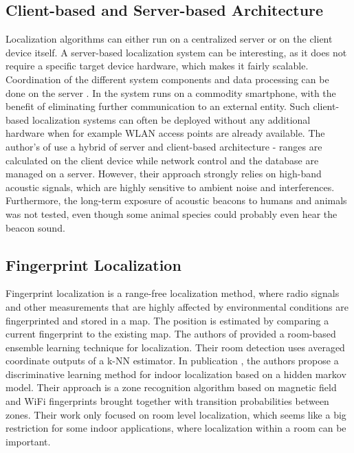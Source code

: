 \subsection{Client-based and Server-based Architecture}
Localization algorithms can either run on a centralized server or on the client device itself. A server-based localization system can be interesting, as it does not require a specific target device hardware, which makes it fairly scalable. Coordination of the different system components and data processing can be done on the server \cite{Delmastro}.
In \cite{Carrera} the system runs on a commodity smartphone, with the benefit of eliminating further communication to an external entity. Such client-based localization systems can often be deployed without any additional hardware when for example WLAN access points are already available. The author's of \cite{Guoguo} use a hybrid of server and client-based architecture - ranges are calculated on the client device while network control and the database are managed on a server. However, their approach strongly relies on high-band acoustic signals, which are highly sensitive to ambient noise and interferences. Furthermore, the long-term exposure of acoustic beacons to humans and animals was not tested, even though some animal species could probably even hear the beacon sound.

\subsection{Fingerprint Localization}
Fingerprint localization is a range-free localization method, where radio signals and other measurements that are highly affected by environmental conditions are fingerprinted and stored in a map. The position is estimated by comparing a current fingerprint to the existing map. The authors of \cite{Taniuchi} provided a room-based ensemble learning technique for localization. Their room detection uses averaged coordinate outputs of a k-NN estimator. In publication \cite{Carrera2}, the authors propose a discriminative learning method for indoor localization based on a hidden markov model. Their approach is a zone recognition algorithm based on magnetic field and WiFi fingerprints brought together with transition probabilities between zones. Their work only focused on room level localization, which seems like a big restriction for some indoor applications, where localization within a room can be important.

